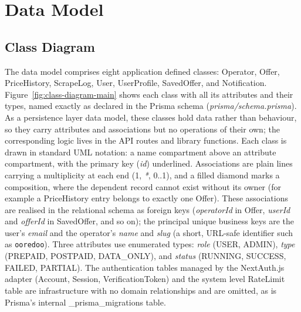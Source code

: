 \section{Data Model}

\subsection{Class Diagram}

The data model comprises eight application defined classes: Operator, Offer, PriceHistory, ScrapeLog, User, UserProfile, SavedOffer, and Notification. Figure~\ref{fig:class-diagram-main} shows each class with all its attributes and their types, named exactly as declared in the Prisma schema (\textit{prisma/schema.prisma}). As a persistence layer data model, these classes hold data rather than behaviour, so they carry attributes and associations but no operations of their own; the corresponding logic lives in the API routes and library functions. Each class is drawn in standard UML notation: a name compartment above an attribute compartment, with the primary key (\emph{id}) underlined. Associations are plain lines carrying a multiplicity at each end (1, \emph{*}, 0..1), and a filled diamond marks a composition, where the dependent record cannot exist without its owner (for example a PriceHistory entry belongs to exactly one Offer). These associations are realised in the relational schema as foreign keys (\emph{operatorId} in Offer, \emph{userId} and \emph{offerId} in SavedOffer, and so on); the principal unique business keys are the user's \emph{email} and the operator's \emph{name} and \emph{slug} (a short, URL-safe identifier such as \texttt{ooredoo}). Three attributes use enumerated types: \emph{role} (USER, ADMIN), \emph{type} (PREPAID, POSTPAID, DATA\_ONLY), and \emph{status} (RUNNING, SUCCESS, FAILED, PARTIAL). The authentication tables managed by the NextAuth.js adapter (Account, Session, VerificationToken) and the system level RateLimit table are infrastructure with no domain relationships and are omitted, as is Prisma's internal \_prisma\_migrations table.

